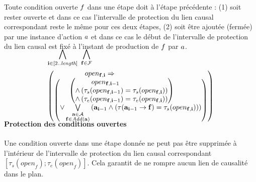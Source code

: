 Toute condition ouverte $f$ dans une étape doit à l'étape précédente : (1) soit rester ouverte et dans ce cas l'intervalle de protection du lien causal correspondant reste le même pour ces deux étapes, (2) soit être ajoutée (fermée) par une instance d'action $a$ et dans ce cas le début de l'intervalle de protection du lien causal est fixé à l'instant de production de $f$ par $a$.

\begin{small}
\begin{multline*}
~\\[-3em]
\bigwedge\limits_{\substack{\mathbf{i}\in [2..\mathbf{\length}]}}~\bigwedge\limits_{\substack{\mathbf{\f}\in \mathbf{\F}}}\hfill\\
\begin{pmatrix}open_{\mathbf{\f},\mathbf{i}} \Rightarrow\hfill\\ \begin{pmatrix}\begin{pmatrix}open_{\mathbf{\f},\mathbf{i} - 1}\hfill\\ \wedge %
\left(\tau_{s}(open_{\mathbf{\f},\mathbf{i} - 1}) = \tau_{s}(open_{\mathbf{\f},\mathbf{i}})\right)\hfill\\
 \wedge \left(\tau_{e}(open_{\mathbf{f},\mathbf{i} - 1}) = \tau_{e}(open_{\mathbf{\f},\mathbf{i}})
 \right)\end{pmatrix}\hfill\\
 \vee \bigvee\limits_{\substack{\mathbf{\a}\in \mathbf{\A}\\\mathbf{\f} \in \add{\mathbf{\a}}}}\left(\mathbf{\a}_{\mathbf{i} - 1} \wedge \left(\tau(\mathbf{\a}_{\mathbf{i} - 1}\rightarrow \mathbf{\f}) = \tau_{s}(open_{\mathbf{\f},\mathbf{i}})\right)\right)\hfill\\
 \end{pmatrix}\end{pmatrix}\\[-2em]
\end{multline*}
\end{small}


\paragraph*{Protection des conditions ouvertes}

Une condition ouverte dans une étape donnée ne peut pas être supprimée à l'intérieur de l'intervalle de protection du lien causal correspondant $[\tau_{s}(\textit{open}_{f});\tau_{e}(\textit{open}_{f})]$. Cela garantit de ne rompre aucun lien de causalité dans le plan.


